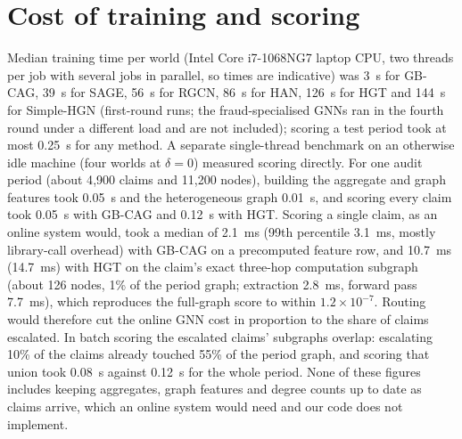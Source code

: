 \documentclass[pdflatex,sn-vancouver-num]{sn-jnl}
\begin{document}
\section{Cost of training and scoring}\label{sec:s_cost}
Median training time per world (Intel Core i7-1068NG7 laptop CPU, two
threads per job with several jobs in parallel, so times are indicative) was
3~s for GB-CAG, 39~s for SAGE, 56~s for RGCN, 86~s for HAN, 126~s for HGT and
144~s for Simple-HGN (first-round runs; the fraud-specialised GNNs ran in the fourth round under a different
load and are not included); scoring a test period took at most 0.25~s for any method. A separate single-thread benchmark on an otherwise idle machine (four
worlds at $\delta=0$) measured scoring directly. For one audit period (about
4{,}900 claims and 11{,}200 nodes), building the aggregate and graph features
took 0.05~s and the heterogeneous graph 0.01~s, and scoring every claim took
0.05~s with GB-CAG and 0.12~s with HGT. Scoring a single claim, as an online
system would, took a median of 2.1~ms (99th percentile 3.1~ms, mostly
library-call overhead) with GB-CAG on a precomputed feature row, and 10.7~ms
(14.7~ms) with HGT on the claim's exact three-hop computation subgraph (about
126 nodes, 1\% of the period graph; extraction 2.8~ms, forward pass 7.7~ms),
which reproduces the full-graph score to within $1.2\times10^{-7}$. Routing
would therefore cut the online GNN cost in proportion to the share of claims
escalated. In batch scoring the escalated claims' subgraphs overlap:
escalating 10\% of the claims already touched 55\% of the period graph, and
scoring that union took 0.08~s against 0.12~s for the whole period. None of
these figures includes keeping aggregates, graph features and degree counts
up to date as claims arrive, which an online system would need and our code
does not implement.
\end{document}
